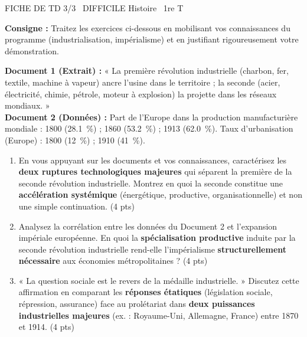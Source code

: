 \documentclass[11pt]{article}
\begin{document}
\begin{tcolorbox}[enhanced,colback=popink,colframe=popink,arc=10pt,boxrule=0pt,left=12pt,right=12pt,top=9pt,bottom=9pt]
{\color{white}\popxbold\small FICHE DE TD 3/3 \textbullet\ DIFFICILE \hfill Histoire \textbullet\ 1re T\par}
\end{tcolorbox}
\vspace{4pt}

\noindent \textbf{Consigne :} Traitez les exercices ci-dessous en mobilisant vos connaissances du programme (industrialisation, impérialisme) et en justifiant rigoureusement votre démonstration.

\begin{exercice}
\textbf{Document 1 (Extrait) :} « La première révolution industrielle (charbon, fer, textile, machine à vapeur) ancre l'usine dans le territoire ; la seconde (acier, électricité, chimie, pétrole, moteur à explosion) la projette dans les réseaux mondiaux. »\\
\textbf{Document 2 (Données) :} Part de l'Europe dans la production manufacturière mondiale : 1800 (\SI{28,1}{\%}) ; 1860 (\SI{53,2}{\%}) ; 1913 (\SI{62,0}{\%}). Taux d'urbanisation (Europe) : 1800 (\SI{12}{\%}) ; 1910 (\SI{41}{\%}).

\begin{enumerate}
    \item En vous appuyant sur les documents et vos connaissances, caractérisez les \textbf{deux ruptures technologiques majeures} qui séparent la première de la seconde révolution industrielle. Montrez en quoi la seconde constitue une \textbf{accélération systémique} (énergétique, productive, organisationnelle) et non une simple continuation. \hfill (4 pts)
    \item Analysez la corrélation entre les données du Document 2 et l'expansion impériale européenne. En quoi la \textbf{spécialisation productive} induite par la seconde révolution industrielle rend-elle l'impérialisme \textbf{structurellement nécessaire} aux économies métropolitaines ? \hfill (4 pts)
    \item « La question sociale est le revers de la médaille industrielle. » Discutez cette affirmation en comparant les \textbf{réponses étatiques} (législation sociale, répression, assurance) face au prolétariat dans \textbf{deux puissances industrielles majeures} (ex. : Royaume-Uni, Allemagne, France) entre 1870 et 1914. \hfill (4 pts)
\end{enumerate}
\end{exercice}
\end{document}
